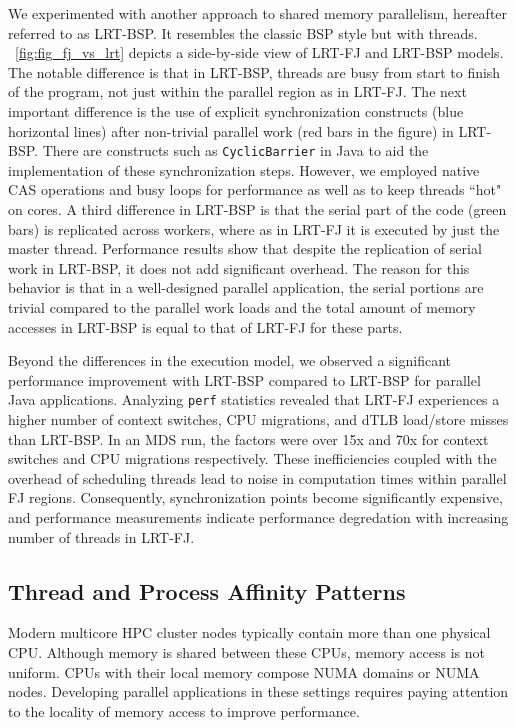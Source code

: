 \documentclass[10pt, conference, compsocconf]{IEEEtran}
\begin{document}
We experimented with another approach to shared memory parallelism, hereafter referred to as \ac{LRT-BSP}. It resembles the classic \ac{BSP} style but with threads. \figurename~\ref{fig:fig_fj_vs_lrt} depicts a side-by-side view of \ac{LRT-FJ} and \ac{LRT-BSP} models. The notable difference is that in \ac{LRT-BSP}, threads are busy from start to finish of the program, not just within the parallel region as in \ac{LRT-FJ}. The next important difference is the use of explicit synchronization constructs (blue horizontal lines) after non-trivial parallel work (red bars in the figure) in \ac{LRT-BSP}. There are constructs such as \texttt{CyclicBarrier} in Java to aid the implementation of these synchronization steps. However, we employed native \ac{CAS} operations and busy loops for performance as well as to keep threads ``hot" on cores.  A third difference in \ac{LRT-BSP} is that the serial part of the code (green bars) is replicated across workers, where as in \ac{LRT-FJ} it is executed by just the master thread. Performance results show that despite the replication of serial work in \ac{LRT-BSP}, it does not add significant overhead. The reason for this behavior is that in a well-designed parallel application, the serial portions are trivial compared to the parallel work loads and the total amount of memory accesses in \ac{LRT-BSP} is equal to that of \ac{LRT-FJ} for these parts. 

Beyond the differences in the execution model, we observed a significant performance improvement with \ac{LRT-BSP} compared to \ac{LRT-BSP} for parallel Java applications. Analyzing \texttt{perf} statistics revealed that \ac{LRT-FJ} experiences a higher number of context switches, \acs{CPU} migrations, and \ac{dTLB} load/store misses than \ac{LRT-BSP}. In an \ac{MDS} run, the factors were over 15x and 70x for context switches and \acs{CPU} migrations respectively. These inefficiencies coupled with the overhead of scheduling threads lead to noise in computation times within parallel \ac{FJ} regions. Consequently, synchronization points become significantly expensive, and performance measurements indicate performance degredation with increasing number of threads in \ac{LRT-FJ}.


\subsection{Thread and Process Affinity Patterns}
Modern multicore \ac{HPC} cluster nodes typically contain more than one physical \acs{CPU}. Although memory is shared between these \acp{CPU}, memory access is not uniform. \acp{CPU} with their local memory compose \ac{NUMA} domains or \ac{NUMA} nodes. Developing parallel applications in these settings requires paying attention to the locality of memory access to improve performance.
\end{document}
